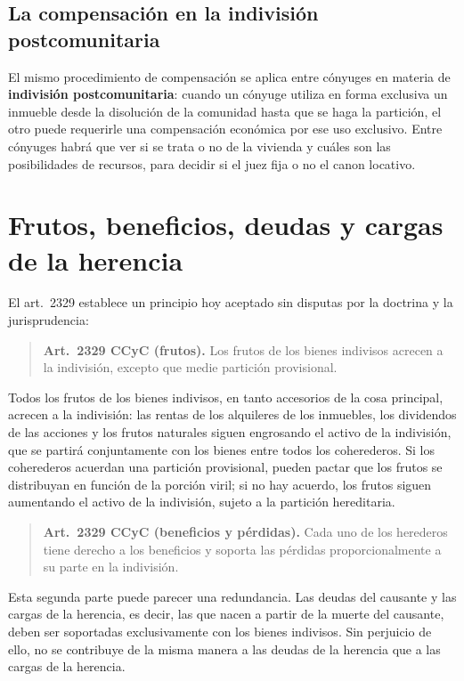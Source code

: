 \documentclass[12pt,oneside]{book}
\begin{document}
\subsection{La compensación en la indivisión postcomunitaria}

El mismo procedimiento de compensación se aplica entre cónyuges en materia de \textbf{indivisión postcomunitaria}: cuando un cónyuge utiliza en forma exclusiva un inmueble desde la disolución de la comunidad hasta que se haga la partición, el otro puede requerirle una compensación económica por ese uso exclusivo. Entre cónyuges habrá que ver si se trata o no de la vivienda y cuáles son las posibilidades de recursos, para decidir si el juez fija o no el canon locativo.

\section{Frutos, beneficios, deudas y cargas de la herencia}

El art.~2329 establece un principio hoy aceptado sin disputas por la doctrina y la jurisprudencia:

\begin{quote}
\textbf{Art.~2329 CCyC (frutos).} Los frutos de los bienes indivisos acrecen a la indivisión, excepto que medie partición provisional.
\end{quote}

Todos los frutos de los bienes indivisos, en tanto accesorios de la cosa principal, acrecen a la indivisión: las rentas de los alquileres de los inmuebles, los dividendos de las acciones y los frutos naturales siguen engrosando el activo de la indivisión, que se partirá conjuntamente con los bienes entre todos los coherederos. Si los coherederos acuerdan una partición provisional, pueden pactar que los frutos se distribuyan en función de la porción viril; si no hay acuerdo, los frutos siguen aumentando el activo de la indivisión, sujeto a la partición hereditaria.

\begin{quote}
\textbf{Art.~2329 CCyC (beneficios y pérdidas).} Cada uno de los herederos tiene derecho a los beneficios y soporta las pérdidas proporcionalmente a su parte en la indivisión.
\end{quote}

Esta segunda parte puede parecer una redundancia. Las deudas del causante y las cargas de la herencia, es decir, las que nacen a partir de la muerte del causante, deben ser soportadas exclusivamente con los bienes indivisos. Sin perjuicio de ello, no se contribuye de la misma manera a las deudas de la herencia que a las cargas de la herencia.
\end{document}
